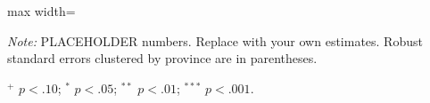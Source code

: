\begin{table}[htbp]
\begin{adjustbox}{max width=\textwidth}
\begin{threeparttable}
  \begin{tablenotes}
    \footnotesize
    \item \textit{Note:} PLACEHOLDER numbers. Replace with your own
    estimates. Robust standard errors clustered by province are in
    parentheses. \\
    \item $^{+}$ $p < .10$; $^{*}$ $p < .05$; $^{**}$ $p < .01$; $^{***}$ $p < .001$.
  \end{tablenotes}
  \end{threeparttable}
  \end{adjustbox}
\end{table}
